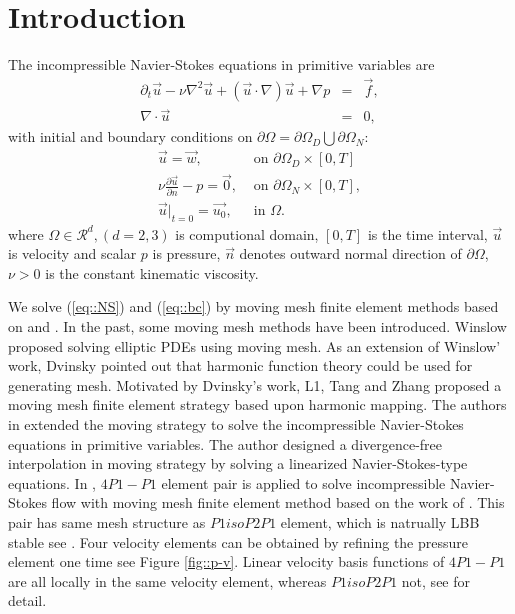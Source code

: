 \documentclass{eajam}
\begin{document}
\section{Introduction}
    \label{sec1} The incompressible Navier-Stokes equations in
    primitive variables are 
    \begin{equation}
      \begin{array}{rcl}
         \partial_t \vec{u} - \nu \nabla^2 \vec{u} +
        (\vec{u} \cdot \nabla )\vec{u} + \nabla p & =
        & \vec{f},\\
        \nabla \cdot \vec{u} & = & 0,
      \end{array}
      \label{eq::NS}
    \end{equation}
    with initial and boundary conditions on $\partial
    \Omega = \partial \Omega_D \bigcup \partial \Omega_N$:
    \begin{equation}
      \begin{array}{ll}
        \vec{u} = \vec{w},& \mbox{ on } \partial \Omega_D \times [0,
        T]\\
        \nu \displaystyle \frac{\partial \vec{u}}{\partial n} - p =
        \vec{0}, & \mbox{ on } \partial \Omega_N \times [0, T],  \\
        \vec{u}|_{t = 0} = \vec{u_0}, & \mbox{ in } \Omega. 
      \end{array}
      \label{eq::bc}
    \end{equation}    
    where $\Omega \in \mathcal{R}^d,(d = 2, 3)$ is computional domain,
    $[0,T]$ is the time interval, $\vec{u}$ is velocity and scalar $p$
    is pressure, $\vec{n}$ denotes outward normal direction of
    $\partial \Omega$, $\nu > 0$ is the constant kinematic
    viscosity.

    We solve (\ref{eq::NS}) and (\ref{eq::bc}) by moving
    mesh finite element methods based on \cite{li2001mesh} and
    \cite{di2005}. In the past, some moving mesh methods have been
    introduced. Winslow \cite{Winslow1966NUMERICAL} proposed solving
    elliptic PDEs using moving mesh. As an extension of Winslow' work,
    Dvinsky \cite{dvinsky1991adaptive} pointed out that harmonic
    function theory could be used for generating mesh. Motivated by
    Dvinsky's work, L1, Tang and Zhang \cite{li2001mesh} proposed a
    moving mesh finite element strategy based upon harmonic
    mapping. The authors in \cite{di2005moving} extended the moving
    strategy to solve the incompressible Navier-Stokes equations in
    primitive variables. The author designed a divergence-free
    interpolation in moving strategy by solving a linearized
    Navier-Stokes-type equations. In \cite{Wu2016moving}, $4P1-P1$
    element pair is applied to solve incompressible Navier-Stokes flow
    with moving mesh finite element method based on the work of
    \cite{di2005moving}. This pair has same mesh structure as
    $P1isoP2P1$ element, which is natrually LBB stable see
    \cite{bercovier1979error}. Four velocity elements can be obtained
    by refining the pressure element one time see Figure
    \ref{fig::p-v}. Linear velocity basis functions of
    $4P1-P1$ are all locally in the same velocity element, whereas
    $P1isoP2P1$ not, see \cite{Wu2016moving} for detail.
\end{document}
